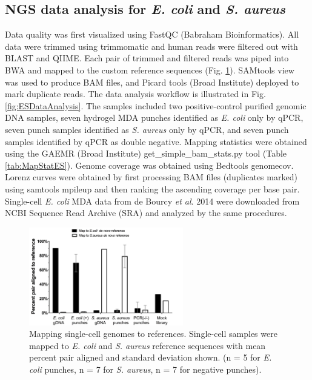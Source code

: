 \subsection{NGS data analysis for \textit{E. coli} and \textit{S. aureus}}
Data quality was first visualized using FastQC (Babraham Bioinformatics). All data were trimmed using trimmomatic \cite{Bolger:2014ek} and human reads were filtered out with BLAST and QIIME. Each pair of trimmed and filtered reads was piped into BWA and mapped to the custom reference sequences (Fig. \ref{fig:MappingES}). SAMtools view was used to produce BAM files, and Picard tools (Broad Institute) deployed to mark duplicate reads. The data analysis workflow is illustrated in Fig. \ref{fig:ESDataAnalysis}. The samples included two positive-control purified genomic DNA samples, seven hydrogel MDA punches identified as \textit{E. coli} only by qPCR, seven punch samples identified as \textit{S. aureus} only by qPCR, and seven punch samples identified by qPCR as double negative. Mapping statistics were obtained using the GAEMR (Broad Institute) get\_simple\_bam\_stats.py tool (Table \ref{tab:MapStatES}). Genome coverage was obtained using Bedtools genomecov. Lorenz curves were obtained by first processing BAM files (duplicates marked) using samtools mpileup and then ranking the ascending coverage per base pair. Single-cell \textit{E. coli} MDA data from de Bourcy \textit{et al}. 2014 were downloaded from NCBI Sequence Read Archive (SRA) and analyzed by the same procedures. 

\begin{figure}
\centering
\includegraphics[keepaspectratio,width=0.6\textwidth]{./figures/SuppFig7.jpg}
\caption[Mapping single-cell genomes to references]{Mapping single-cell genomes to references. Single-cell samples were mapped to \textit{E. coli} and \textit{S. aureus} reference sequences with mean percent pair aligned and standard deviation shown. (n = 5 for \textit{E. coli} punches, n = 7 for \textit{S. aureus}, n = 7 for negative punches).}
\label{fig:MappingES}
\end{figure}

